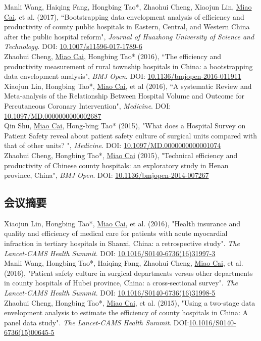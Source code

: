 \documentclass[11pt, a4paper]{article}
\newcommand{\years}[1]{\marginnote{\scriptsize #1}}
\begin{document}
\years{2017}Manli Wang, Haiqing Fang, Hongbing Tao*, Zhaohui Cheng, Xiaojun Lin, \underline{Miao Cai}, et al. (2017), “Bootstrapping data envelopment analysis of efficiency and productivity of county public hospitals in Eastern, Central, and Western China after the public hospital reform", \emph{Journal of Huazhong University of Science and Technology}. DOI: \href{https://doi.org/10.1007/s11596-017-1789-6}{10.1007/s11596-017-1789-6}\\
\years{2016}Zhaohui Cheng, \underline{Miao Cai}, Hongbing Tao* (2016), “The efficiency and productivity measurement of rural township hospitals in China: a bootstrapping data envelopment analysis", \emph{BMJ Open}. DOI: \href{https://doi.org/10.1136/bmjopen-2016-011911}{10.1136/bmjopen-2016-011911}\\
\years{2016}Xiaojun Lin, Hongbing Tao*, \underline{Miao Cai}, et al (2016), “A systematic Review and Meta-analysis of the Relationship Between Hospital Volume and Outcome for Percutaneous Coronary Intervention", \emph{Medicine}. DOI: \href{https://doi.org/10.1097/MD.0000000000002687}{10.1097/MD.0000000000002687}\\
\years{2015}Qin Shu, \underline{Miao Cai}, Hong-bing Tao* (2015), "What does a Hospital Survey on Patient Safety reveal about patient safety culture of surgical units compared with that of other units? ", \emph{Medicine}. DOI: \href{https://doi.org/10.1097/MD.0000000000001074}{10.1097/MD.0000000000001074}\\
\years{2015}Zhaohui Cheng, Hongbing Tao*, \underline{Miao Cai} (2015), "Technical efficiency and productivity of Chinese county hospitals: an exploratory study in Henan province, China", \emph{BMJ Open}. DOI: \href{https://doi.org/10.1136/bmjopen-2014-007267}{10.1136/bmjopen-2014-007267}

\subsection*{会议摘要}
\noindent
\years{2016}Xiaojun Lin, Hongbing Tao*, \underline{Miao Cai}, et al. (2016), "Health insurance and quality and efficiency of medical care for patients with acute myocardial infraction in tertiary hospitals in Shanxi, China: a retrospective study". \emph{The Lancet-CAMS Health Summit}. DOI: \href{https://doi.org/10.1016/S0140-6736(16)31997-3}{10.1016/S0140-6736(16)31997-3}\\
\years{2016}Manli Wang, Hongbing Tao*, Haiqing Fang, Zhaohui Cheng, \underline{Miao Cai}, et al. (2016), "Patient safety culture in surgical departments versus other departments in county hospitals of Hubei province, China: a cross-sectional survey". \emph{The Lancet-CAMS Health Summit}. DOI: \href{https://doi.org/10.1016/S0140-6736(16)31998-5}{10.1016/S0140-6736(16)31998-5}\\
\years{2015}Zhaohui Cheng, Hongbing Tao*, \underline{Miao Cai}, et al.  (2015), "Using a two-stage data envelopment analysis to estimate the efficiency of county hospitals in China: A panel data study". \emph{The Lancet-CAMS Health Summit}. DOI:\href{https://doi.org/10.1016/S0140-6736(15)00645-5}{10.1016/S0140-6736(15)00645-5} 
\end{document}
